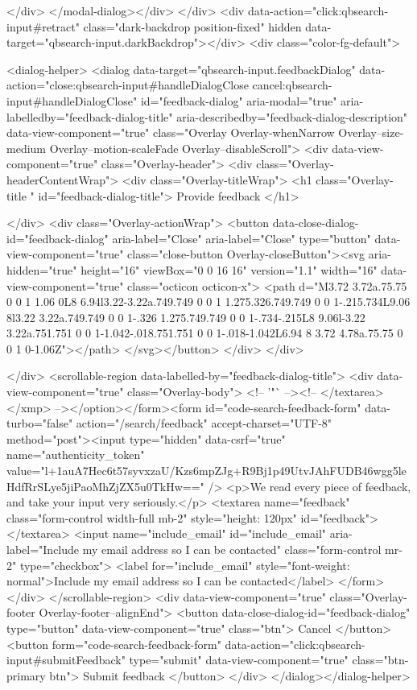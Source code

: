     </div>
</modal-dialog></div>
  </div>
  <div data-action="click:qbsearch-input#retract" class="dark-backdrop position-fixed" hidden data-target="qbsearch-input.darkBackdrop"></div>
  <div class="color-fg-default">
    
<dialog-helper>
  <dialog data-target="qbsearch-input.feedbackDialog" data-action="close:qbsearch-input#handleDialogClose cancel:qbsearch-input#handleDialogClose" id="feedback-dialog" aria-modal="true" aria-labelledby="feedback-dialog-title" aria-describedby="feedback-dialog-description" data-view-component="true" class="Overlay Overlay-whenNarrow Overlay--size-medium Overlay--motion-scaleFade Overlay--disableScroll">
    <div data-view-component="true" class="Overlay-header">
  <div class="Overlay-headerContentWrap">
    <div class="Overlay-titleWrap">
      <h1 class="Overlay-title " id="feedback-dialog-title">
        Provide feedback
      </h1>
        
    </div>
    <div class="Overlay-actionWrap">
      <button data-close-dialog-id="feedback-dialog" aria-label="Close" aria-label="Close" type="button" data-view-component="true" class="close-button Overlay-closeButton"><svg aria-hidden="true" height="16" viewBox="0 0 16 16" version="1.1" width="16" data-view-component="true" class="octicon octicon-x">
    <path d="M3.72 3.72a.75.75 0 0 1 1.06 0L8 6.94l3.22-3.22a.749.749 0 0 1 1.275.326.749.749 0 0 1-.215.734L9.06 8l3.22 3.22a.749.749 0 0 1-.326 1.275.749.749 0 0 1-.734-.215L8 9.06l-3.22 3.22a.751.751 0 0 1-1.042-.018.751.751 0 0 1-.018-1.042L6.94 8 3.72 4.78a.75.75 0 0 1 0-1.06Z"></path>
</svg></button>
    </div>
  </div>
  
</div>
      <scrollable-region data-labelled-by="feedback-dialog-title">
        <div data-view-component="true" class="Overlay-body">        <!-- '"` --><!-- </textarea></xmp> --></option></form><form id="code-search-feedback-form" data-turbo="false" action="/search/feedback" accept-charset="UTF-8" method="post"><input type="hidden" data-csrf="true" name="authenticity_token" value="l+1auA7Hec6t57syvxzaU/Kzs6mpZJg+R9Bj1p49UtvJAhFUDB46wgg5leHdfRrSLye5jiPaoMhZjZX5u0TkHw==" />
          <p>We read every piece of feedback, and take your input very seriously.</p>
          <textarea name="feedback" class="form-control width-full mb-2" style="height: 120px" id="feedback"></textarea>
          <input name="include_email" id="include_email" aria-label="Include my email address so I can be contacted" class="form-control mr-2" type="checkbox">
          <label for="include_email" style="font-weight: normal">Include my email address so I can be contacted</label>
</form></div>
      </scrollable-region>
      <div data-view-component="true" class="Overlay-footer Overlay-footer--alignEnd">          <button data-close-dialog-id="feedback-dialog" type="button" data-view-component="true" class="btn">    Cancel
</button>
          <button form="code-search-feedback-form" data-action="click:qbsearch-input#submitFeedback" type="submit" data-view-component="true" class="btn-primary btn">    Submit feedback
</button>
</div>
</dialog></dialog-helper>

